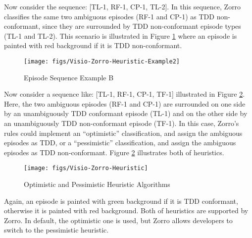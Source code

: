 Now consider the sequence: [TL-1, RF-1, CP-1, TL-2].  In this sequence, 
Zorro classifies the same two ambiguous episodes (RF-1 and CP-1) as TDD 
non-conformant, since they are surrounded by TDD non-conformant episode types 
(TL-1 and TL-2). This scenario is illustrated in Figure 
\ref{fig:Zorro-EpisodeSequence-ExampleB} where an episode is painted
with red background if it is TDD non-conformant. 
\begin{figure}[htbp]
  \centering
  \texttt{[image: figs/Visio-Zorro-Heuristic-Example2]}
  \caption{Episode Sequence Example B}
  \label{fig:Zorro-EpisodeSequence-ExampleB}
\end{figure}

Now consider a sequence like: [TL-1, RF-1, CP-1, TF-1] illustrated 
in Figure \ref{fig:Zorro-HeuristicAlgorithm}. Here, the two ambiguous 
episodes (RF-1 and CP-1) are surrounded on one side by an unambiguously 
TDD conformant episode (TL-1) and on the other side by an unambiguously 
TDD non-conformant episode (TF-1).  In this case, Zorro's rules 
could implement an ``optimistic'' classification, and assign the
ambiguous episodes as TDD, or a ``pessimistic'' classification, and 
assign the ambiguous episodes as TDD non-conformant. 
Figure \ref{fig:Zorro-HeuristicAlgorithm} illustrates both of heuristics. 
\begin{figure}[htbp]
  \centering
  \texttt{[image: figs/Visio-Zorro-Heuristic]}
  \caption{Optimistic and Pessimistic Heuristic Algorithms}
  \label{fig:Zorro-HeuristicAlgorithm}
\end{figure}
Again, an episode is painted with green background if it is TDD 
conformant, otherwise it is painted with red background. Both of 
heuristics are supported by Zorro. In default, the optimistic
one is used, but Zorro allows developers to switch to the 
pessimistic heuristic.

